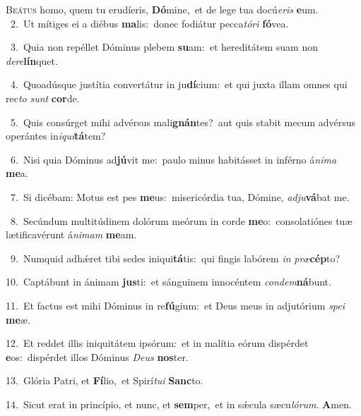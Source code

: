 \lettrine{\initial\textcolor{\initialcolor}{B}}{eátus} homo, quem tu erudíeris, \textbf{Dó}\-mine,~\star et de lege tua docú\-\textit{e}\-\textit{ris} \textbf{e}\-um.\\
{\numbfont\textcolor{\numbcolor}{~2.}}~Ut mítiges ei a diébus \textbf{ma}\-lis:~\star donec fodiátur pecca\-\textit{tó}\-\textit{ri} \textbf{fó}\-vea.\par
{\numbfont\textcolor{\numbcolor}{~3.}}~Quia non repéllet Dóminus plebem \textbf{su}\-am:~\star et hereditátem suam non \textit{de}\-\textit{re}\textbf{lín}quet.\par
{\numbfont\textcolor{\numbcolor}{~4.}}~Quoadúsque justítia convertátur in ju\-\textbf{dí}\-cium:~\star et qui juxta illam omnes qui rec\textit{to} \textit{sunt} \textbf{cor}\-de.\par
{\numbfont\textcolor{\numbcolor}{~5.}}~Quis consúrget mihi advérsus mali\-\textbf{gnán}\-tes?~\star aut quis stabit mecum advérsus operántes in\-\textit{i}\-\textit{qui}\textbf{tá}tem?\par
{\numbfont\textcolor{\numbcolor}{~6.}}~Nisi quia Dóminus ad\-\textbf{jú}\-vit me:~\star paulo minus habitásset in inférno á\-\textit{ni}\-\textit{ma} \textbf{me}\-a.\par
{\numbfont\textcolor{\numbcolor}{~7.}}~Si dicébam: Motus est pes \textbf{me}\-us:~\star misericórdia tua, Dómine, \textit{ad}\-\textit{ju}\textbf{vá}bat me.\par
{\numbfont\textcolor{\numbcolor}{~8.}}~Secúndum multitúdinem dolórum meórum in corde \textbf{me}\-o:~\star consolatiónes tuæ lætificavérunt á\-\textit{ni}\-\textit{mam} \textbf{me}\-am.\par
{\numbfont\textcolor{\numbcolor}{~9.}}~Numquid adhǽret tibi sedes iniqui\-\textbf{tá}\-tis:~\star qui fingis labórem \textit{in} \textit{præ}\-\textbf{cép}to?\par
{\numbfont\textcolor{\numbcolor}{10.}}~Captábunt in ánimam \textbf{jus}\-ti:~\star et sánguinem innocéntem \textit{con}\-\textit{dem}\textbf{ná}bunt.\par
{\numbfont\textcolor{\numbcolor}{11.}}~Et factus est mihi Dóminus in re\-\textbf{fú}\-gium:~\star et Deus meus in adjutórium \textit{spe}\-\textit{i} \textbf{me}\-æ.\par
{\numbfont\textcolor{\numbcolor}{12.}}~Et reddet illis iniquitátem ipsórum:~\dagger et in malítia eórum dispérdet \textbf{e}\-os:~\star dispérdet illos Dóminus \textit{De}\-\textit{us} \textbf{nos}\-ter.\par
{\numbfont\textcolor{\numbcolor}{13.}}~Glória Patri, et \textbf{Fí}\-lio,~\star et Spirí\-\textit{tu}\-\textit{i} \textbf{Sanc}\-to.\par
{\numbfont\textcolor{\numbcolor}{14.}}~Sicut erat in princípio, et nunc, et \textbf{sem}\-per,~\star et in sǽcula sæcu\-\textit{ló}\-\textit{rum}. \textbf{A}\-men.\par
